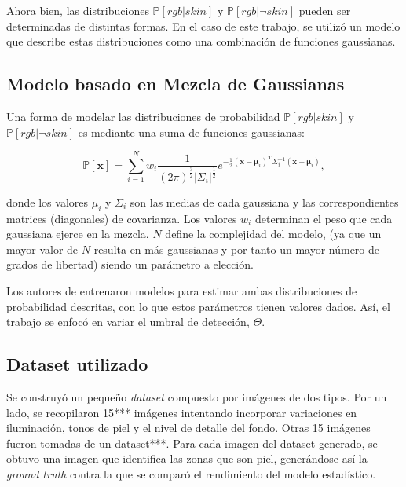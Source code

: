 \documentclass[12pt]{article}
\begin{document}
Ahora bien, las distribuciones $\mathbb{P} [ rgb|skin ]$ y $\mathbb{P} [ rgb | \neg
skin ]$ pueden ser determinadas de distintas formas. En el caso de este trabajo, se
utilizó un modelo que describe estas distribuciones como una combinación de
funciones gaussianas.

\subsection{Modelo basado en Mezcla de Gaussianas}

Una forma de modelar las distribuciones de probabilidad  $\mathbb{P} [ rgb|skin
]$ y $\mathbb{P} [ rgb | \neg skin ]$ es mediante una suma de funciones
gaussianas:

\begin{equation}
    \mathbb{P}[\mathbf{x}] = \sum\limits_{i=1}^N w_i
    \frac{1}{(2\pi)^{\frac{3}{2}} | \Sigma_i |^\frac{1}{2}} e^{-\frac{1}{2}
    (\mathbf{x} - \mathbf{\mu}_i)^{\text{T}} \Sigma_i ^{-1} (\mathbf{x} -
    \mathbf{\mu}_i)},
\end{equation} 

donde los valores $\mu_i$ y $\Sigma_i$ son las medias de cada gaussiana y las
correspondientes matrices (diagonales) de covarianza. Los valores $w_i$
determinan el peso que cada gaussiana ejerce en la mezcla. $N$ define la
complejidad del modelo, (ya que un mayor valor de $N$ resulta en más gaussianas
y por tanto un mayor número de grados de libertad) siendo un parámetro a
elección. 

Los autores de \cite{skin} entrenaron modelos para estimar ambas
distribuciones de probabilidad descritas, con lo que estos parámetros tienen
valores dados. Así, el trabajo se enfocó en variar el umbral de detección,
$\Theta$.

\subsection{Dataset utilizado}

Se construyó un pequeño \emph{dataset} compuesto por imágenes de dos tipos. Por
un lado, se recopilaron 15*** imágenes intentando incorporar variaciones en
iluminación, tonos de piel y el nivel de detalle del fondo. Otras 15 imágenes
fueron tomadas de un dataset***. Para cada imagen del dataset generado, se
obtuvo una imagen que identifica las zonas que son piel, generándose así la
\emph{ground truth} contra la que se comparó el rendimiento del modelo
estadístico.
\end{document}
